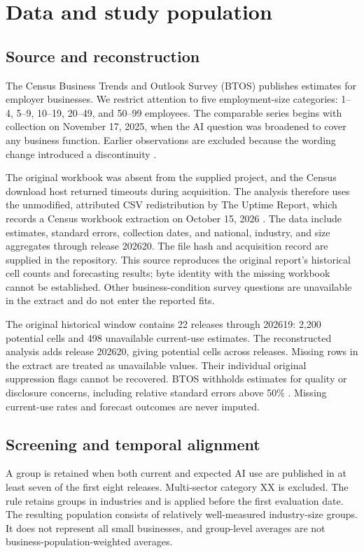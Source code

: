 \documentclass[11pt]{article}
\begin{document}
\section{Data and study population}
\subsection{Source and reconstruction}
The Census Business Trends and Outlook Survey (BTOS) publishes estimates for employer businesses. We restrict attention to five employment-size categories: 1--4, 5--9, 10--19, 20--49, and 50--99 employees. The comparable series begins with collection on November 17, 2025, when the AI question was broadened to cover any business function. Earlier observations are excluded because the wording change introduced a discontinuity \cite{wording}.

The original workbook was absent from the supplied project, and the Census download host returned timeouts during acquisition. The analysis therefore uses the unmodified, attributed CSV redistribution by The Uptime Report, which records a Census workbook extraction on October 15, 2026 \cite{extract}. The data include estimates, standard errors, collection dates, and national, industry, and size aggregates through release 202620. The file hash and acquisition record are supplied in the repository. This source reproduces the original report's historical cell counts and forecasting results; byte identity with the missing workbook cannot be established. Other business-condition survey questions are unavailable in the extract and do not enter the reported fits.

The original historical window contains 22 releases through 202619: 2,200 potential cells and 498 unavailable current-use estimates. The reconstructed analysis adds release 202620, giving \CellN{} potential cells across \ReleaseN{} releases. Missing rows in the extract are treated as unavailable values. Their individual original suppression flags cannot be recovered. BTOS withholds estimates for quality or disclosure concerns, including relative standard errors above 50\% \cite{censusmethods}. Missing current-use rates and forecast outcomes are never imputed.

\subsection{Screening and temporal alignment}
A group is retained when both current and expected AI use are published in at least seven of the first eight releases. Multi-sector category XX is excluded. The rule retains \GroupN{} groups in \IndustryN{} industries and is applied before the first evaluation date. The resulting population consists of relatively well-measured industry-size groups. It does not represent all small businesses, and group-level averages are not business-population-weighted averages.
\end{document}
